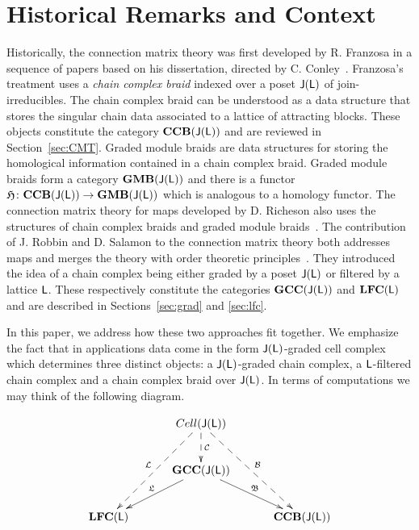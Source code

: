 

\section{Historical Remarks and Context}

Historically, the connection matrix theory was first developed by R. Franzosa in a sequence of papers based on his dissertation, directed by C. Conley~\cite{fran,fran2,fran3}.  Franzosa's treatment uses a {\em chain complex braid} indexed over a poset ${\mathsf J}({\mathsf L})$ of join-irreducibles.  The chain complex braid can be understood as a data structure that stores the singular chain data associated to a lattice of attracting blocks. These objects constitute the category ${\bf CCB}({\mathsf J}({\mathsf L}))$ and are reviewed in Section~\ref{sec:CMT}.   Graded module braids are data structures for storing the homological information contained in a chain complex braid.  Graded module braids form a category ${\bf GMB}({\mathsf J}({\mathsf L}))$ and there is a functor $\mathfrak{H}\colon {\bf CCB}({\mathsf J}({\mathsf L}))\to {\bf GMB}({\mathsf J}({\mathsf L}))$ which is analogous to a homology functor. The connection matrix theory for maps developed by D. Richeson also uses the structures of chain complex braids and graded module braids~\cite{richeson}.   The contribution of J. Robbin and D. Salamon to the connection matrix theory both addresses maps and merges the theory with order theoretic principles~\cite{robbin:salamon2}.  They introduced the idea of a chain complex being either graded by a poset ${\mathsf J}({\mathsf L})$ or filtered by a lattice ${\mathsf L}$.   These respectively constitute the categories ${\bf GCC}({\mathsf J}({\mathsf L}))$ and ${\bf LFC}({\mathsf L})$ and are described in Sections~\ref{sec:grad} and \ref{sec:lfc}.

In this paper, we address how these two approaches fit together.  We emphasize the fact that in applications data come in the form ${\mathsf J}({\mathsf L})$-graded cell complex which determines three distinct objects: a ${\mathsf J}({\mathsf L})$-graded chain complex, a ${\mathsf L}$-filtered chain complex and a chain complex braid over ${\mathsf J}({\mathsf L})$.   In terms of computations we may think of the following diagram.  %

\begin{align}\label{dia:concept}
\xymatrixrowsep{0.35in}
\xymatrixcolsep{0.45in}
\xymatrix{
& & Cell(\sJ(\sL)) \ar@{-->}[d]^{\cC} \ar@{-->}[ddl]_{\cL} \ar@{-->}[ddr]^{\cB} & &  \\
& & \bGCC(\sJ(\sL)) \ar[dl]_{\mathfrak{L}} \ar[dr]^{\mathfrak{B}} & &  \\
&\bLFC(\sL)  & &  \bCCB(\sJ(\sL))&
}
\end{align}

